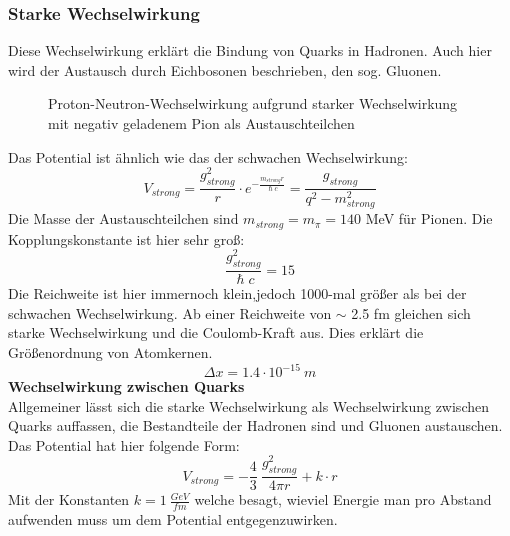 \documentclass[Ex4_Zusammenfassung.tex]{subfiles}
\begin{document}
\subsubsection{Starke Wechselwirkung}
Diese Wechselwirkung erklärt die Bindung von Quarks in Hadronen. Auch hier wird der Austausch durch Eichbosonen beschrieben, den sog. Gluonen. 
\begin{figure}[H]
\centering
{}
					\caption{Proton-Neutron-Wechselwirkung aufgrund starker Wechselwirkung mit negativ geladenem Pion als Austauschteilchen}
\end{figure}
Das Potential ist ähnlich wie das der schwachen Wechselwirkung:
\begin{equation}
V_{strong} = \frac{g_{strong}^2}{r} \cdot e^{-\frac{m_{strong} r}{\hslash c}} = \frac{g_{strong}}{q^2 - m_{strong}^2}
\end{equation}
Die Masse der Austauschteilchen sind  $ m_{strong} = m_{\pi} = 140 $ MeV für Pionen. \newline
Die Kopplungskonstante ist hier sehr groß:
\begin{equation}
\frac{g_{strong}^2}{\hslash c } = 15 
\end{equation}
Die Reichweite ist hier immernoch klein,jedoch 1000-mal größer als bei der schwachen Wechselwirkung. Ab einer Reichweite von $ \sim $ 2.5 fm gleichen sich starke Wechselwirkung und die Coulomb-Kraft aus. Dies erklärt die Größenordnung von Atomkernen. 
\begin{equation}
\Delta x = 1.4 \cdot 10^{-15} \ m 
\end{equation}
\newpage
\textbf{Wechselwirkung zwischen Quarks} \\ \newline
Allgemeiner lässt sich die starke Wechselwirkung als Wechselwirkung zwischen Quarks auffassen, die Bestandteile der Hadronen sind und Gluonen austauschen. Das Potential hat hier folgende Form: 
\begin{equation}
V_{strong} = - \frac{4}{3} \  \frac{g_{strong}^2}{4 \pi r} + k \cdot r 
\end{equation}
Mit der Konstanten $ k = 1 \  \frac{GeV}{fm} $ welche besagt, wieviel Energie man pro Abstand aufwenden muss um dem Potential entgegenzuwirken. 
\end{document}
